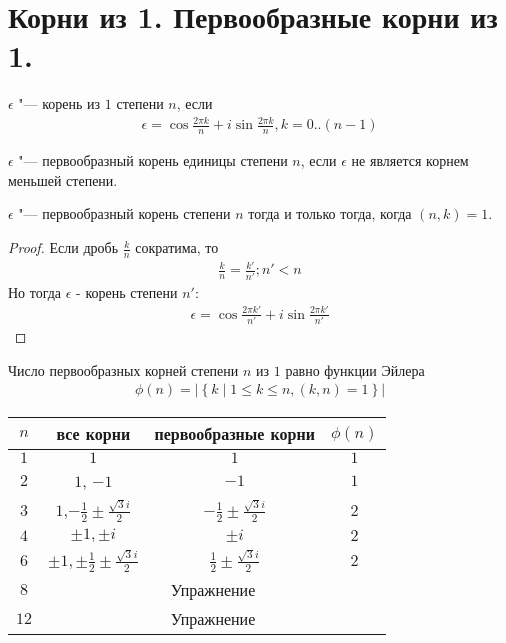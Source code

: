 ﻿\section{Корни из 1. Первообразные корни из 1.}

\begin{Def}
$\epsilon$ "--- корень из $1$ степени $n$, если
\begin{gather*}
\epsilon = \cos{\frac{2 \pi k}{n}} + i \sin{\frac{2 \pi k}{n}}, k = 0..(n - 1)
\end{gather*}
\end{Def}

\begin{Def}
$\epsilon$ "--- первообразный корень единицы степени $n$, если $\epsilon$ не является корнем меньшей степени.
\end{Def}

\begin{assertion}
$\epsilon$ "--- первообразный корень степени $n$ тогда и только тогда, когда $(n, k) = 1$.
\end{assertion}

\begin{proof}
Если дробь $\frac{k}{n}$ сократима, то 
\begin{gather*}
\frac{k}{n} = \frac{k'}{n'}; n' < n
\end{gather*}
Но тогда $\epsilon$ - корень степени $n'$: 
\begin{gather*}
\epsilon = \cos\frac{2\pi k'}{n'} + i \sin\frac{2\pi k'}{n'}
\end{gather*}
\end{proof}

\begin{conseq}
Число первообразных корней степени $n$ из $1$ равно функции Эйлера
\begin{gather*}
\phi(n) = \left|\left\{k \mid 1 \le k \le n, (k, n) = 1\right\}\right|
\end{gather*}
\end{conseq}

\begin{center}
\begin{tabular}{|c|c|c|c|}
\hline
$n$ & все корни & первообразные корни & $\phi(n)$ \\
\hline
$1$ & $1$ & $1$ & $1$ \\
\hline
$2$ & $1$, $-1$ & $-1$ & $1$ \\
\hline
$3$ & $1$,$-\frac{1}{2} \pm \frac{\sqrt{3}i}{2}$ & $-\frac{1}{2} \pm \frac{\sqrt{3}i}{2}$ & $2$ \\
\hline
$4$ & $\pm1,\pm i$ & $\pm i$ & $2$ \\
\hline
$6$ & $\pm1,\pm\frac{1}{2} \pm \frac{\sqrt{3}i}{2}$ & $\frac{1}{2} \pm \frac{\sqrt{3}i}{2}$ & $2$ \\
\hline
$8$ & \multicolumn{3}{c|}{Упражнение} \\
\hline
$12$ & \multicolumn{3}{c|}{Упражнение} \\
\hline
\end{tabular}
\end{center}

